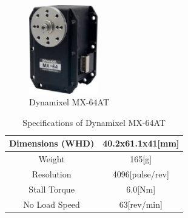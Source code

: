 \documentclass[12pt]{sonota/aislab}
\begin{document}

\begin{figure}[h]
\begin{center}
\includegraphics[clip, width=3cm]{figs/MX_64AT.eps}
\caption{Dynamixel MX-64AT}
\label{Dynamixel}
\end{center}
\end{figure}

\begin{table}[h]
	\caption{Specifications of Dynamixel MX-64AT}
	\label{table:Dynamixel}
	\centering 
	\begin{tabular}[tbp]{|c|c|}
		\hline 
		Dimensions (WHD) & 40.2x61.1x41[mm] \\\hline
		Weight & 165[g] \\\hline
		Resolution & 4096[pulse/rev] \\\hline
		Stall Torque & 6.0[Nm] \\\hline
		No Load Speed & 63[rev/min] \\\hline
	\end{tabular}
\end{table}
\end{document}
